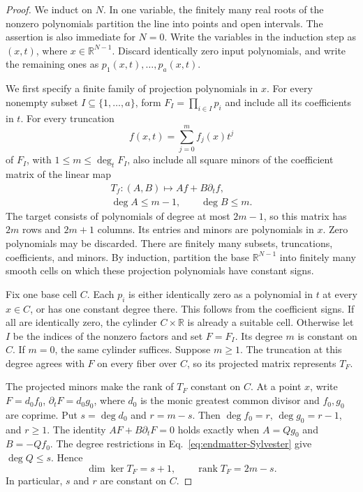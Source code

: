 \documentclass[aps,prl,reprint,notitlepage,nofootinbib,nobibnotes]{revtex4-2}
\begin{document}
\begin{proof}
We induct on \(N\). In one variable, the finitely many real roots of
the nonzero polynomials partition the line into points and open
intervals. The assertion is also immediate for \(N=0\).
Write the variables in the induction step as \((x,t)\), where
\(x\in\mathbb R^{N-1}\). Discard identically zero input polynomials,
and write the remaining ones as \(p_1(x,t),\ldots,p_a(x,t)\).

We first specify a finite family of projection polynomials in \(x\).
For every nonempty subset \(I\subseteq\{1,\ldots,a\}\), form
\(F_I=\prod_{i\in I}p_i\) and include all its coefficients in \(t\).
For every truncation
\[
 f(x,t)=\sum_{j=0}^{m}f_j(x)t^j
\]
of \(F_I\), with \(1\le m\le\deg_t F_I\), also include all square
minors of the coefficient matrix of the linear map
\begin{equation}\label{eq:endmatter-Sylvester}
 \begin{gathered}
 T_f:(A,B)\longmapsto Af+B\partial_t f,\\
 \deg A\le m-1,\qquad\deg B\le m.
 \end{gathered}
\end{equation}
The target consists of polynomials of degree at most \(2m-1\), so this
matrix has \(2m\) rows and \(2m+1\) columns. Its entries and minors are
polynomials in \(x\). Zero polynomials may be discarded. There are
finitely many subsets, truncations, coefficients, and minors.
By induction, partition the base \(\mathbb R^{N-1}\) into finitely many
smooth cells on which these projection polynomials have constant signs.

Fix one base cell \(C\). Each \(p_i\) is either identically zero as a
polynomial in \(t\) at every \(x\in C\), or has one constant degree
there. This follows from the coefficient signs. If all are identically
zero, the cylinder \(C\times\mathbb R\) is already a suitable cell.
Otherwise let \(I\) be the indices of the nonzero factors and set
\(F=F_I\). Its degree \(m\) is constant on \(C\). If \(m=0\), the same
cylinder suffices. Suppose \(m\ge1\). The truncation at this degree
agrees with \(F\) on every fiber over \(C\), so its projected matrix
represents \(T_F\).

The projected minors make the rank of \(T_F\) constant on \(C\).
At a point \(x\), write
\(F=d_0 f_0\), \(\partial_tF=d_0 g_0\), where \(d_0\) is the monic greatest
common divisor and \(f_0,g_0\) are coprime. Put \(s=\deg d_0\) and
\(r=m-s\). Then \(\deg f_0=r\), \(\deg g_0=r-1\), and \(r\ge1\).
The identity \(AF+B\partial_tF=0\) holds exactly when
\(A=Qg_0\) and \(B=-Qf_0\). The degree restrictions in
Eq.~\eqref{eq:endmatter-Sylvester} give \(\deg Q\le s\). Hence
\[
 \dim\ker T_F=s+1,\qquad \operatorname{rank}T_F=2m-s.
\]
In particular, \(s\) and \(r\) are constant on \(C\).


\end{proof}
\end{document}
